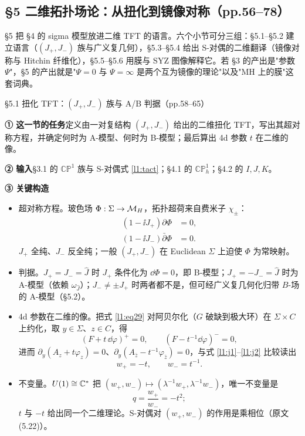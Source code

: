 \subsection*{\S5 二维拓扑场论：从扭化到镜像对称（pp.56--78）}

\S5 把 \S4 的 sigma 模型放进二维 TFT 的语言。六个小节可分三组：\S5.1--\S5.2 建立语言（$(J_+,J_-)$ 族与广义复几何），\S5.3--\S5.4 给出 S-对偶的二维翻译（镜像对称与 Hitchin 纤维化），\S5.5--\S5.6 用膜与 SYZ 图像解释它。若 \S3 的产出是"参数 $\Psi$"，\S5 的产出就是"$\Psi=0$ 与 $\Psi=\infty$ 是两个互为镜像的理论"以及"MH 上的膜"这套词典。\pC

\begin{kcard}{§5.1 扭化 TFT：$(J_+,J_-)$ 族与 A/B 判据（pp.58--65）}

\noindent\textbf{① 这一节的任务}\quad 定义由一对复结构 $(J_+,J_-)$ 给出的二维扭化 TFT，写出其超对称方程，并确定何时为 A-模型、何时为 B-模型；最后算出 4d 参数 $t$ 在二维的像。\pA{}

\noindent\textbf{② 输入}\quad \S3.1 的 $\mathbb{CP}^1$ 族与 S-对偶式 \eqref{l1:tact}；\S4.1 的 $\mathbb{CP}^1_h$；\S4.2 的 $I,J,K$。

\noindent\textbf{③ 关键构造}\quad
\begin{itemize}
\item 超对称方程。玻色场 $\Phi:\Sigma\to\mathcal{M}_H$，拓扑超荷来自费米子 $\chi_\pm$：
\begin{align}
(1-\ii J_+)\partial\Phi&=0,\tag{5.5}\label{l1:j1}\\
(1-\ii J_-)\bar\partial\Phi&=0.\tag{5.6}\label{l1:j2}
\end{align}
$J_+$ 全纯、$J_-$ 反全纯；一般 $(J_+,J_-)$ 在 Euclidean $\Sigma$ 上迫使 $\Phi$ 为常映射。\pA{}
\item 判据。$J_+=J_-=\hat J$ 时 $J_+$ 条件化为 $\dd\Phi=0$，即 B-模型；$J_+=-J_-=\hat J$ 时为 A-模型（依赖 $\omega_{\hat J}$）；$J_-\ne\pm J_+$ 时两者都不是，但可经广义复几何化归带 $B$-场的 A-模型（\S5.2）。\pA{}
\item 4d 参数在二维的像。把式 \eqref{l1:eq29} 对阿贝尔化（$G$ 破缺到极大环）在 $\Sigma\times C$ 上约化，取 $y\in\Sigma$、$z\in C$，得
\[
(F+t\,\dd\varphi)^+=0,\qquad(F-t^{-1}\dd\varphi)^-=0 ,
\]
进而 $\partial_y(A_z+t\varphi_z)=0$、$\partial_y(A_{\bar z}-t^{-1}\varphi_{\bar z})=0$，与式 \eqref{l1:j1}--\eqref{l1:j2} 比较读出
\begin{equation}\label{l1:wpm}\tag{5.11}
w_+=-t,\qquad w_-=t^{-1} .
\end{equation}
\pA{}
\item 不变量。$U(1)\cong\mathbb{C}^*$ 把 $(w_+,w_-)\mapsto(\lambda^{-1}w_+,\lambda^{-1}w_-)$，唯一不变量是
\begin{equation}\label{l1:qinv}\tag{5.12}
q=\frac{w_+}{w_-}=-t^2 ;
\end{equation}
$t$ 与 $-t$ 给出同一个二维理论。S-对偶对 $(w_+,w_-)$ 的作用是乘相位（原文 (5.22)）。\pA{}
\end{itemize}


\end{kcard}
